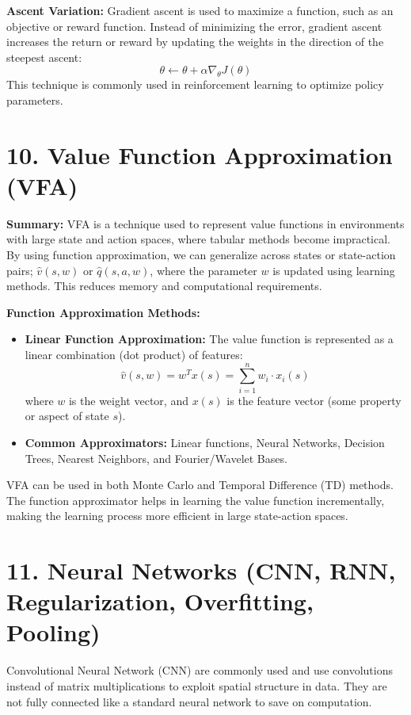 \documentclass[letterpaper,10pt]{article}
\begin{document}
\begin{multicols}{2}
\noindent \textbf{Ascent Variation:} Gradient ascent is used to maximize a function, such as an objective or reward function. Instead of minimizing the error, gradient ascent increases the return or reward by updating the weights in the direction of the steepest ascent:
\[
\theta \leftarrow \theta + \alpha \nabla_\theta J(\theta)
\]
This technique is commonly used in reinforcement learning to optimize policy parameters.

\section*{10. Value Function Approximation (VFA)}
\textbf{Summary:} VFA is a technique used to represent value functions in environments with large state and action spaces, where tabular methods become impractical. By using function approximation, we can generalize across states or state-action pairs; \( \hat{v}(s,w) \) or \( \hat{q}(s,a,w) \), where the parameter \(w \) is updated using learning methods. This reduces memory and computational requirements.

\noindent \textbf{Function Approximation Methods:}
\begin{itemize}
    \item \textbf{Linear Function Approximation:} The value function is represented as a linear combination (dot product) of features:
    \[
    \hat{v}(s, w) = w^T x(s) = \sum_{i=1}^{n} w_i \cdot x_i(s)
    \]
    where \(w\) is the weight vector, and \(x(s)\) is the feature vector (some property or aspect of state \( s \)).
    \item \textbf{Common Approximators:} Linear functions, Neural Networks, Decision Trees, Nearest Neighbors, and Fourier/Wavelet Bases.
\end{itemize}

VFA can be used in both Monte Carlo and Temporal Difference (TD) methods. The function approximator helps in learning the value function incrementally, making the learning process more efficient in large state-action spaces.


\section*{11. Neural Networks (CNN, RNN, Regularization, Overfitting, Pooling)}
Convolutional Neural Network (CNN) are commonly used and use convolutions instead of matrix multiplications to exploit spatial structure in data. They are not fully connected like a standard neural network to save on computation.


\end{multicols}
\end{document}
